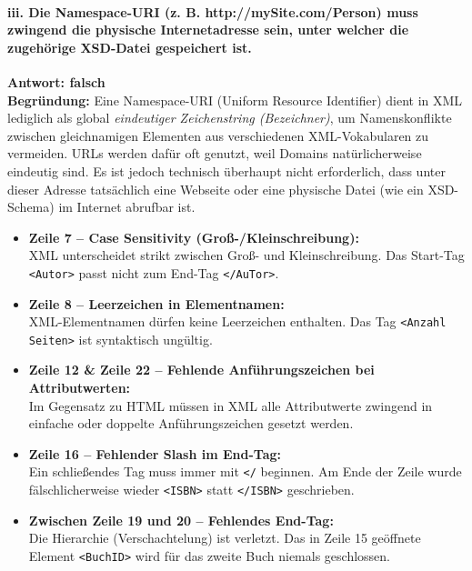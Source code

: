 \documentclass[12pt]{scrartcl}
\begin{document}
\paragraph*{iii. Die Namespace-URI (z. B. http://mySite.com/Person) muss zwingend die physische Internetadresse sein, unter welcher die zugehörige XSD-Datei gespeichert ist.}
\textbf{Antwort: falsch} \\
\textbf{Begründung:} Eine Namespace-URI (Uniform Resource Identifier) dient in XML lediglich als global \textit{eindeutiger Zeichenstring (Bezeichner)}, um Namenskonflikte zwischen gleichnamigen Elementen aus verschiedenen XML-Vokabularen zu vermeiden. URLs werden dafür oft genutzt, weil Domains natürlicherweise eindeutig sind. Es ist jedoch technisch überhaupt nicht erforderlich, dass unter dieser Adresse tatsächlich eine Webseite oder eine physische Datei (wie ein XSD-Schema) im Internet abrufbar ist.
\newpage
\begin{itemize}
    \item \textbf{Zeile 7 -- Case Sensitivity (Groß-/Kleinschreibung):} \\
    XML unterscheidet strikt zwischen Groß- und Kleinschreibung. Das Start-Tag \texttt{<Autor>} passt nicht zum End-Tag \texttt{</AuTor>}.

    \item \textbf{Zeile 8 -- Leerzeichen in Elementnamen:} \\
    XML-Elementnamen dürfen keine Leerzeichen enthalten. Das Tag \texttt{<Anzahl Seiten>} ist syntaktisch ungültig.

    \item \textbf{Zeile 12 \& Zeile 22 -- Fehlende Anführungszeichen bei Attributwerten:} \\
    Im Gegensatz zu HTML müssen in XML alle Attributwerte zwingend in einfache oder doppelte Anführungszeichen gesetzt werden.

    \item \textbf{Zeile 16 -- Fehlender Slash im End-Tag:} \\
    Ein schließendes Tag muss immer mit \texttt{</} beginnen. Am Ende der Zeile wurde fälschlicherweise wieder \texttt{<ISBN>} statt \texttt{</ISBN>} geschrieben.

    \item \textbf{Zwischen Zeile 19 und 20 -- Fehlendes End-Tag:} \\
    Die Hierarchie (Verschachtelung) ist verletzt. Das in Zeile 15 geöffnete Element \texttt{<BuchID>} wird für das zweite Buch niemals geschlossen.
\end{itemize}
\end{document}
